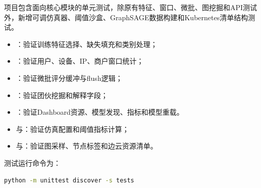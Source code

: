 项目包含面向核心模块的单元测试，除原有特征、窗口、微批、图挖掘和API测试外，新增可调仿真器、阈值沙盒、GraphSAGE数据构建和Kubernetes清单结构测试。

\begin{itemize}
  \item {}：验证训练特征选择、缺失填充和类别处理；
  \item {}：验证用户、设备、IP、商户窗口统计；
  \item {}：验证微批评分缓冲与flush逻辑；
  \item {}：验证团伙挖掘和解释字段；
  \item {}：验证Dashboard资源、模型发现、指标和模型重载。
  \item {}与：验证仿真配置和阈值指标计算；
  \item {}与：验证图采样、节点标签和边云资源清单。
\end{itemize}

测试运行命令为：

\begin{lstlisting}[language=bash]
python -m unittest discover -s tests
\end{lstlisting}
